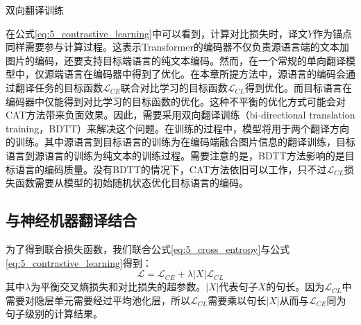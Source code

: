 {\sffamily 双向翻译训练}

在公式\ref{eq:5_contrastive_learning}中可以看到，计算对比损失时，译文$Y$作为锚点同样需要参与计算过程。这表示Transformer的编码器不仅负责源语言端的文本加图片的编码，还要支持目标端语言的纯文本编码。然而，在一个常规的单向翻译模型中，仅源端语言在编码器中得到了优化。在本章所提方法中，源语言的编码会通过翻译任务的目标函数$\mathcal{L}_{CE}$联合对比学习的目标函数$\mathcal{L}_{CL}$得到优化。而目标语言在编码器中仅能得到对比学习的目标函数的优化。这种不平衡的优化方式可能会对CAT方法带来负面效果。因此，需要采用双向翻译训练（bi-directional translation training，BDTT）来解决这个问题。在训练的过程中，模型将用于两个翻译方向的训练。其中源语言到目标语言的训练为在编码端融合图片信息的翻译训练，目标语言到源语言的训练为纯文本的训练过程。需要注意的是，BDTT方法影响的是目标语言的编码质量。没有BDTT的情况下，CAT方法依旧可以工作，只不过$\mathcal{L}_{CL}$损失函数需要从模型的初始随机状态优化目标语言的编码。

\subsection{与神经机器翻译结合}
\label{sec:5_combine_with_nmt}

为了得到联合损失函数，我们联合公式\ref{eq:5_cross_entropy}与公式\ref{eq:5_contrastive_learning}得到：
\begin{equation}
    \mathcal{L}=\mathcal{L}_{CE} + \lambda|X|\mathcal{L}_{CL}
    \label{eq:5_combine_with_nmt}
\end{equation}
其中$\lambda$为平衡交叉熵损失和对比损失的超参数。$|X|$代表句子$X$的句长。因为$\mathcal{L}_{CL}$中需要对隐层单元需要经过平均池化层，所以$\mathcal{L}_{CL}$需要乘以句长$|X|$从而与$\mathcal{L}_{CE}$同为句子级别的计算结果。